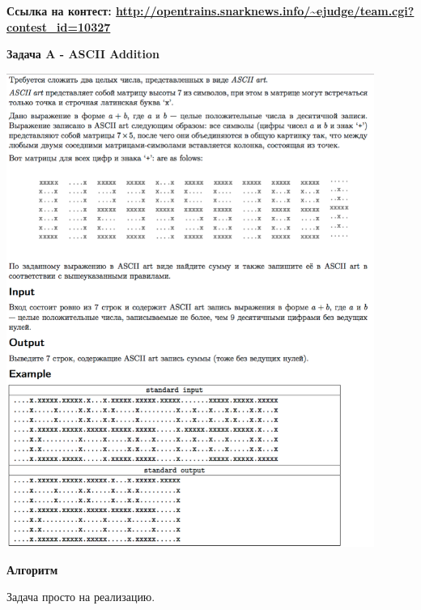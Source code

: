 \documentclass[a4paper,12pt]{article}
\begin{document}
\textbf{{\large Ссылка на контест: \url{http://opentrains.snarknews.info/~ejudge/team.cgi?contest_id=10327}}}

\newpage
\textbf{{\large Задача A - ASCII Addition}}

\begin{center}
\includegraphics[width=0.9\textwidth]{OC_Europe/A.png}\\ [1cm]
\end{center}

\textbf{{\large Алгоритм}}

Задача просто на реализацию. \\
\end{document}
